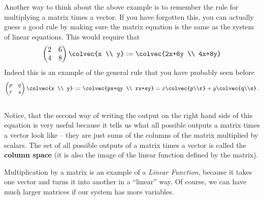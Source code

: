 Another way to think about the above example is to remember the rule for multiplying a matrix times a vector.
\hypertarget{system2matrix}{If} you have forgotten this, you can actually  guess a good rule by making sure the matrix equation is the same as the system of linear equations.
This would require that
$$
 \begin{pmatrix}
      2     & 6 \\
      4     & 8
    \end{pmatrix}
  \colvec{x \\ y}
  :=   \colvec{2x+6y \\ 4x+8y}
$$
Indeed this is an example of
\hypertarget{ch1vecmult}{the general rule} that you have probably seen before
\begin{equation*}\label{2x2multiplication}
    \begin{pmatrix}
      p     & q  \\
      r      & s
    \end{pmatrix}
  \colvec{x \\ y}
  :=
  \colvec{px+qy \\ rx+sy}=x\colvec{p\\r} + y\colvec{q\\s}\, .
\end{equation*}\\%
Notice, that the second way of writing the output on the right hand side of this equation is very useful because it
tells us what all possible outputs a matrix times a vector look like -- they are just sums of the columns of the matrix
multiplied by scalars. The set of all possible outputs of a matrix times a vector is called 
the {\bf column space} (it is also the image of the linear function defined by the matrix).


 


\noindent
Multiplication by 
\hypertarget{earlier}{a matrix} is an example of a \emph{Linear Function}, because it takes one vector and turns it into another in a ``linear'' way.
Of course, we can have much larger matrices if our system has more variables.


